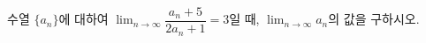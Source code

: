 수열 $\{a_n\}$에 대하여 $\displaystyle\lim_{n\to\infty}\dfrac{a_n+5}{2a_n+1}=3$일 때, $\displaystyle\lim_{n\to\infty}a_n$의 값을 구하시오.
